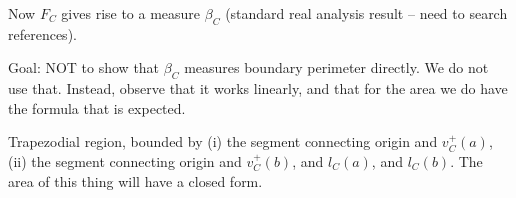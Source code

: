 Now $F_C$ gives rise to a measure $\beta_C$ (standard real analysis result -- need to search references).

Goal: NOT to show that $\beta_C$ measures boundary perimeter directly.
We do not use that.
Instead, observe that it works linearly,
and that for the area we do have the formula that is expected.

Trapezodial region, bounded by (i) the segment connecting origin and $v_C^+(a)$, (ii) the segment connecting origin and $v_C^+(b)$, and $l_C(a)$, and $l_C(b)$.
The area of this thing will have a closed form.


